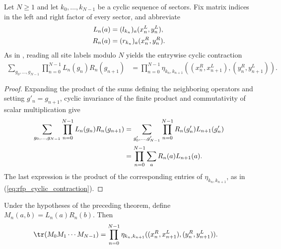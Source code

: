 \begin{lemma}
    \label{thm:mpdo_cyclic_sector_contraction}
    \leanok
    Let $N\geq1$ and let $k_0,\ldots,k_{N-1}$ be a cyclic sequence of
    sectors. Fix matrix indices in the left and right factor of every sector,
    and abbreviate
    \begin{align}
        L_n(a) & =(l_{k_n})_a(x_n^L,y_n^L), \notag \\
        R_n(a) & =(r_{k_n})_a(x_n^R,y_n^R). \notag
    \end{align}
    As in \cite[Appendix~C.2, lines~1446--1450]{Cirac2016MPDO_arXiv}, reading
    all site labels modulo $N$ yields the entrywise cyclic contraction
    \begin{align}
        \sum_{g_0,\ldots,g_{N-1}}
        \prod_{n=0}^{N-1}L_n(g_n)R_n(g_{n+1})
         & =\prod_{n=0}^{N-1}
        \eta_{k_n,k_{n+1}}
        ((x_n^R,x_{n+1}^L),(y_n^R,y_{n+1}^L)).
        \label{eq:rfp_cyclic_contraction}
    \end{align}
\end{lemma}

\begin{proof}
    \leanok
    Expanding the product of the sums defining the neighboring operators and
    setting $g'_n=g_{n+1}$, cyclic invariance of the finite product and
    commutativity of scalar multiplication give
    \begin{align}
        \sum_{g_0,\ldots,g_{N-1}}
        \prod_{n=0}^{N-1}L_n(g_n)R_n(g_{n+1})
         & =\sum_{g'_0,\ldots,g'_{N-1}}
        \prod_{n=0}^{N-1}R_n(g'_n)L_{n+1}(g'_n) \notag       \\
         & =\prod_{n=0}^{N-1}\sum_a R_n(a)L_{n+1}(a). \notag
    \end{align}
    The last expression is the product of the corresponding entries of
    $\eta_{k_n,k_{n+1}}$, as in (\ref{eq:rfp_cyclic_contraction}).
\end{proof}

\begin{lemma}
    \label{thm:mpdo_sector_word_eta_contraction}
    \leanok
    Under the hypotheses of the preceding theorem, define
    $M_n(a,b)=L_n(a)R_n(b)$. Then
    \begin{align}
        \tr(M_0M_1\cdots M_{N-1})
         & =\prod_{n=0}^{N-1}
        \eta_{k_n,k_{n+1}}
        ((x_n^R,x_{n+1}^L),(y_n^R,y_{n+1}^L)).
        \label{eq:rfp_sector_word}
    \end{align}
\end{lemma}


